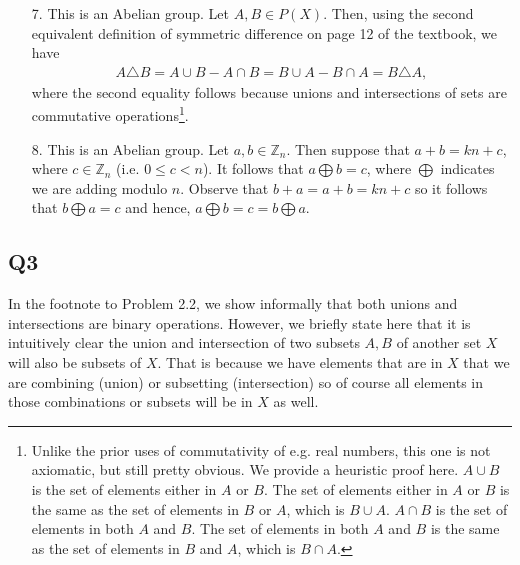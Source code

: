 \documentclass[12pt]{article}
\def\Z{{\mathbb Z}}        %
\numberwithin{theorem}{section}
\numberwithin{equation}{section}
\numberwithin{remark}{section}
\numberwithin{definition}{section}
\numberwithin{theorem}{section}
\numberwithin{lemma}{section}
\numberwithin{example}{section}
\begin{document}
\begin{itemize}
{\begin{itemize}
{				\begin{align*}
					(f+g)(x)=f(x)+g(x)=g(x)+f(x)=(g+f)(x),
				\end{align*}
			where the second equality follows because addition of real numbers is commutative.}
			\item[7.]{This is an Abelian group. Let $A,B\in P(X)$. Then, using the second equivalent definition of symmetric difference on page 12 of the textbook, we have
				\begin{align*}
					A\triangle B = A\cup B - A \cap B = B\cup A - B\cap A = B\triangle A,
				\end{align*}
			where the second equality follows because unions and intersections of sets are commutative operations\footnote{Unlike the prior uses of commutativity of e.g. real numbers, this one is not axiomatic, but still pretty obvious. We provide a heuristic proof here. $A\cup B$ is the set of elements either in $A$ or $B$. The set of elements either in $A$ or $B$ is the same as the set of elements in $B$ or $A$, which is $B\cup A$. $A\cap B$ is the set of elements in both $A$ and $B$. The set of elements in both $A$ and $B$ is the same as the set of elements in $B$ and $A$, which is $B\cap A$.}.}
			\item[8.]{This is an Abelian group. Let $a,b\in\Z_n$. Then suppose that $a+b=kn+c$, where $c\in\Z_n$ (i.e. $0\le c < n$). It follows that $a\bigoplus b = c$, where $\bigoplus$ indicates we are adding modulo $n$. Observe that $b+a=a+b=kn+c$ so it follows that $b\bigoplus a = c$ and hence, $a\bigoplus b=c=b\bigoplus a$.}
		\end{itemize}}
\end{itemize}



\subsection{Q3}

In the footnote to Problem 2.2, we show informally that both unions and intersections are binary operations. However, we briefly state here that it is intuitively clear the union and intersection of two subsets $A,B$ of another set $X$ will also be subsets of $X$. That is because we have elements that are in $X$ that we are combining (union) or subsetting (intersection) so of course all elements in those combinations or subsets will be in $X$ as well. 

\vspace{\baselineskip}
\end{document}

